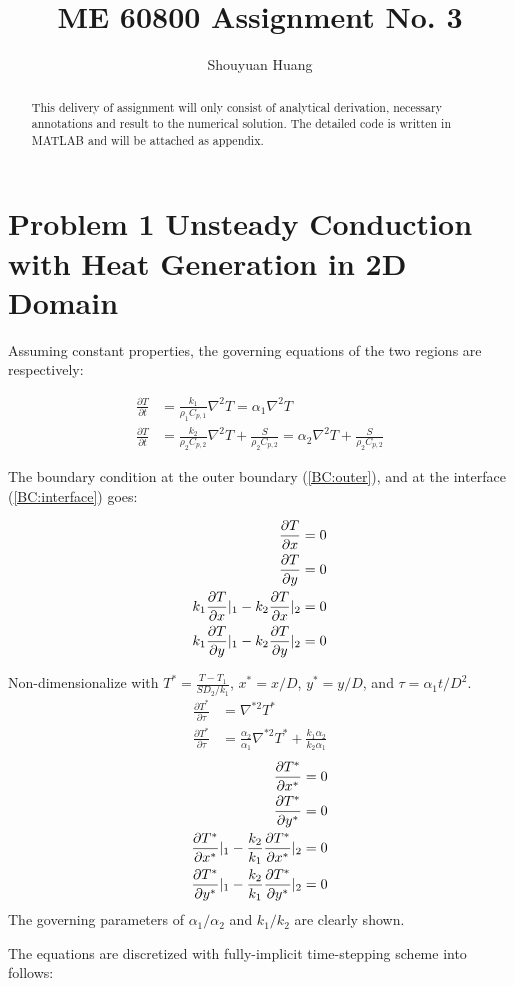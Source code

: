 \documentclass[a4paper,10pt]{article}
\title{ME 60800 Assignment No. 3}
\author{Shouyuan Huang}
\begin{document}
\maketitle

\begin{abstract}
This delivery of assignment will only consist of analytical derivation, necessary annotations and result to the numerical solution.
The detailed code is written in MATLAB and will be attached as appendix.
\end{abstract}

\section{Problem 1 Unsteady Conduction with Heat Generation in 2D Domain}

Assuming constant properties, the governing equations of the two regions are respectively:

\begin{align}
 \frac{\partial T}{\partial t}&=\frac{k_1}{\rho_1 C_{p,1}}\nabla^2T=\alpha_1\nabla^2T \\
 \frac{\partial T}{\partial t}&=\frac{k_2}{\rho_2 C_{p,2}}\nabla^2T+\frac{S}{\rho_2 C_{p,2}}=\alpha_2\nabla^2T+\frac{S}{\rho_2 C_{p,2}}
\end{align}

The boundary condition at the outer boundary (\ref{BC:outer}), and at the interface (\ref{BC:interface}) goes:

\begin{align}
 \frac{\partial T}{\partial x} &= 0 \notag \\
 \frac{\partial T}{\partial y} &= 0 \label{BC:outer} \\
 k_1\frac{\partial T}{\partial x}|_1 - k_2\frac{\partial T}{\partial x}|_2 &= 0\notag \\
 k_1\frac{\partial T}{\partial y}|_1 - k_2\frac{\partial T}{\partial y}|_2 &= 0\label{BC:interface}
\end{align}

Non-dimensionalize with $T^*=\frac{T-T_1}{SD_2/k_1}$, $x^*=x/D$, $y^*=y/D$, and $\tau=\alpha_1t/D^2$. 
\begin{align}
 \frac{\partial T^*}{\partial \tau}&=\nabla^{*2}T^* \\
 \frac{\partial T^*}{\partial \tau}&=\frac{\alpha_2}{\alpha_1}\nabla^{*2}T^*+\frac{k_1\alpha_2}{k_2\alpha_1} 
\end{align}
\begin{align}
 \frac{\partial T^*}{\partial x^*} &= 0 \notag \\
 \frac{\partial T^*}{\partial y^*} &= 0 \label{BC:NDouter} \\
 \frac{\partial T^*}{\partial x^*}|_1-\frac{k_2}{k_1}\frac{\partial T^*}{\partial x^*}|_2&=0 \notag \\
 \frac{\partial T^*}{\partial y^*}|_1-\frac{k_2}{k_1}\frac{\partial T^*}{\partial y^*}|_2&=0
\end{align}
The governing parameters of $\alpha_1/\alpha_2$ and $k_1/k_2$ are clearly shown.


The equations are discretized with fully-implicit time-stepping scheme into follows:
\end{document}
